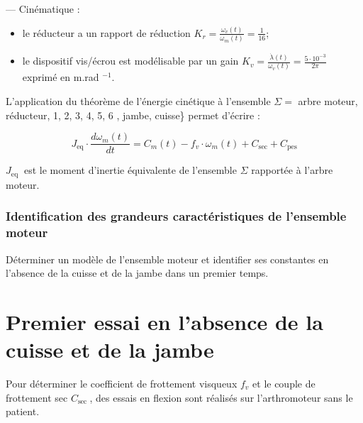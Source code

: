 — Cinématique :

\begin{itemize}
  \item le réducteur a un rapport de réduction $K_{r}=\frac{\omega_{v}(t)}{\omega_{m}(t)}=\frac{1}{16}$;
  \item le dispositif vis/écrou est modélisable par un gain $K_{v}=\frac{\dot{\lambda}(t)}{\omega_{v}(t)}=\frac{5 \cdot 10^{-3}}{2 \pi}$ exprimé en m.rad ${ }^{-1}$.
\end{itemize}

L'application du théorème de l'énergie cinétique à l'ensemble $\Sigma=$ arbre moteur, réducteur, 1, 2, 3, 4, 5, 6 , jambe, cuisse\} permet d'écrire :


\begin{equation*}
J_{\mathrm{eq}} \cdot \frac{d \omega_{m}(t)}{d t}=C_{m}(t)-f_{v} \cdot \omega_{m}(t)+C_{\mathrm{sec}}+C_{\mathrm{pes}} \tag{III.1}
\end{equation*}


$J_{\text {eq }}$ est le moment d'inertie équivalente de l'ensemble $\Sigma$ rapportée à l'arbre moteur.


\subsubsection{Identification des grandeurs caractéristiques de l'ensemble moteur}

\begin{obj}
Déterminer un modèle de l'ensemble moteur et identifier ses constantes en l'absence de la cuisse et de la jambe dans un premier temps.
\end{obj}

\section*{Premier essai en l'absence de la cuisse et de la jambe}
Pour déterminer le coefficient de frottement visqueux $f_{v}$ et le couple de frottement sec $C_{\text {sec }}$, des essais en flexion sont réalisés sur l'arthromoteur sans le patient.

